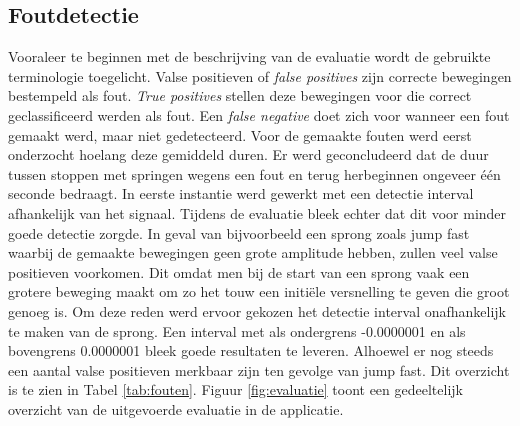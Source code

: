 \subsection{Foutdetectie}
Vooraleer te beginnen met de beschrijving van de evaluatie wordt de gebruikte terminologie toegelicht. Valse positieven of \textit{false positives} zijn correcte bewegingen bestempeld als fout. \textit{True positives} stellen deze bewegingen voor die correct geclassificeerd werden als fout. Een \textit{false negative} doet zich voor wanneer een fout gemaakt werd, maar niet gedetecteerd.
Voor de gemaakte fouten werd eerst onderzocht hoelang deze gemiddeld duren. Er werd geconcludeerd dat de duur tussen stoppen met springen wegens een fout en terug herbeginnen ongeveer één seconde bedraagt. In eerste instantie werd gewerkt met een detectie interval afhankelijk van het signaal. Tijdens de evaluatie bleek echter dat dit voor minder goede detectie zorgde. In geval van bijvoorbeeld een sprong zoals jump fast waarbij de gemaakte bewegingen geen grote amplitude hebben, zullen veel valse positieven voorkomen. Dit omdat men bij de start van een sprong vaak een grotere beweging maakt om zo het touw een initiële versnelling te geven die groot genoeg is. Om deze reden werd ervoor gekozen het detectie interval onafhankelijk te maken van de sprong. Een interval met als ondergrens -0.0000001 en als bovengrens 0.0000001 bleek goede resultaten te leveren. Alhoewel er nog steeds een aantal valse positieven merkbaar zijn ten gevolge van jump fast. Dit overzicht is te zien in Tabel \ref{tab:fouten}. Figuur \ref{fig:evaluatie} toont een gedeeltelijk overzicht van de uitgevoerde evaluatie in de applicatie.

